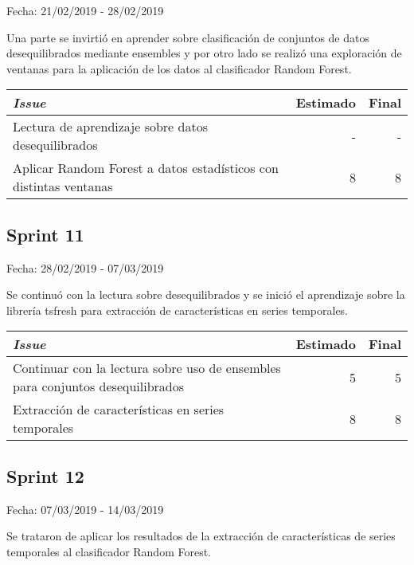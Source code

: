 Fecha: 21/02/2019 - 28/02/2019

Una parte se invirtió en aprender sobre clasificación de conjuntos de datos desequilibrados mediante ensembles y por otro lado se realizó una exploración de ventanas para la aplicación de los datos al clasificador Random Forest. 

\begin{table}[h]
	\begin{tabularx}{\textwidth}{|Xrr|}
		\hline \textbf{\textit{Issue}} & \textbf{Estimado} & \textbf{Final}\\
		\hline Lectura de aprendizaje sobre datos desequilibrados & - & - \\
		\hline Aplicar Random Forest a datos estadísticos con distintas ventanas & 8 & 8 \\
		\hline
	\end{tabularx}
\end{table}

\subsection{Sprint 11}

Fecha: 28/02/2019 - 07/03/2019

Se continuó con la lectura sobre desequilibrados y se inició el aprendizaje sobre la librería tsfresh para extracción de características en series temporales.  

\begin{table}[h]
	\begin{tabularx}{\textwidth}{|Xrr|}
		\hline \textbf{\textit{Issue}} & \textbf{Estimado} & \textbf{Final}\\
		\hline Continuar con la lectura sobre uso de ensembles para conjuntos desequilibrados & 5 & 5 \\
		\hline Extracción de características en series temporales & 8 & 8 \\
		\hline
	\end{tabularx}
\end{table}

\subsection{Sprint 12}

Fecha: 07/03/2019 - 14/03/2019

Se trataron de aplicar los resultados de la extracción de características de series temporales al clasificador Random Forest. 

